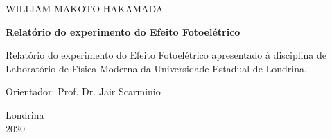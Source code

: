 \documentclass[a4paper, 12pt]{article}
\begin{document}
\begin{titlepage}

\begin{center}
\large WILLIAM MAKOTO HAKAMADA
 

        \vspace{20pt}
        \vspace{95pt}
        \vspace{50pt}
        
        \textbf{\LARGE{Relatório do experimento do Efeito Fotoelétrico}} \\
\end{center}

        \vspace{20pt}
        \vspace{95pt}
       
        
\begin{flushright}

   \begin{list}{}{
      \setlength{\leftmargin}{8cm}
      \setlength{\rightmargin}{0cm}
      \setlength{\labelwidth}{0pt}
      \setlength{\labelsep}{\leftmargin}}

      \item Relatório do experimento do Efeito Fotoelétrico apresentado à disciplina de Laboratório de Física Moderna da Universidade Estadual de Londrina.

      \begin{list}{}{
      \setlength{\leftmargin}{0cm}
      \setlength{\rightmargin}{0cm}
      \setlength{\labelwidth}{0pt}
      \setlength{\labelsep}{\leftmargin}}
			
            \item Orientador: Prof. Dr. Jair Scarminio \

      \end{list}
   \end{list}
\end{flushright}

        \vspace{20pt}
        \vspace{95pt}
        \vspace{50pt}
        
        	\begin{center}
			 Londrina\\
		 2020
			\end{center}
\end{titlepage}
\end{document}
